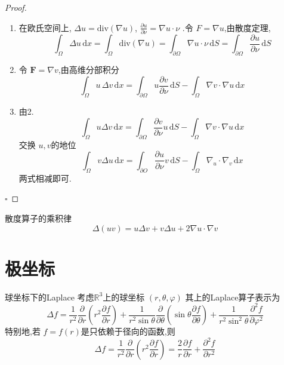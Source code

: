 \documentclass[../../main.tex]{subfiles}
\begin{document}
\begin{proof}
    \begin{enumerate}
        \item 在欧氏空间上, \(   \Delta u= \mathrm{div}\left(  \nabla u \right)   \), \(  \frac{\partial u}{\partial \nu }=  \nabla u\cdot  \nu   \)  .令 \(  F =   \nabla u  \),由散度定理, \[
        \int_{ \Omega } \Delta u\,\mathrm{d} x=  \int_{ \Omega } \mathrm{div}\left(  \nabla u \right)=  \int_{ \partial  \Omega } \nabla u\cdot  \nu \,\mathrm{d} S=  \int_{ \partial  \Omega } \frac{\partial u}{\partial \nu }\,\mathrm{d} S 
        \] 
        \item  令 \(  \mathbf{F}=  \nabla v  \),由高维分部积分 \[
        \int_{ \Omega } u  \,\Delta v\,\mathrm{d} x=  \int_{ \partial  \Omega } u\frac{\partial v}{\partial \nu }\,\mathrm{d} S- \int_{ \Omega }  \nabla v\cdot  \nabla u\,\mathrm{d} x
        \] 
        \item 由2. \[
        \int_{ \Omega }u \Delta v\,\mathrm{d} x=  \int_{ \partial  \Omega } \frac{\partial v}{\partial \nu }u \,\mathrm{d} S- \int_{ \Omega }  \nabla {v}\cdot  \nabla {u}\,\mathrm{d} x
        \]交换 \(  u,v  \)的地位  \[
        \int_{ \Omega }v \Delta u\,\mathrm{d} x= \int_{ \partial O}\frac{\partial u}{\partial \nu }v\,\mathrm{d} S-\int_{ \Omega }  \nabla _{u}\cdot  \nabla _{v}\,\mathrm{d} x
        \]两式相减即可.
    \end{enumerate}
    

    \hfill $\square$
\end{proof}

\begin{theorem}{散度算子的乘积律}
    \[
     \Delta \left( uv \right)= u \Delta v+ v \Delta u+ 2 \nabla u\cdot  \nabla v 
    \]
\end{theorem}

\section{极坐标}

\begin{theorem}{球坐标下的Laplace}
    考虑\(  \mathbb{R} ^{3}  \)上的球坐标 \(  \left( r, \theta , \varphi  \right)   \)  其上的Laplace算子表示为 \[
     \Delta f= \frac{1 }{r^{2} }\frac{\partial }{\partial r}\left( r^{2}\frac{\partial f}{\partial r} \right)+ \frac{1 }{r^{2}\sin  \theta  }\frac{\partial }{\partial  \theta }\left( \sin  \theta \frac{\partial f}{\partial  \theta } \right)+ \frac{1 }{r^{2}\sin ^{2} \theta  }\frac{\partial ^{2}f}{\partial  \varphi ^{2}}     
    \]特别地,若 \(  f= f\left( r \right)   \)是只依赖于径向的函数,则 \[
     \Delta f= \frac{1 }{r^{2} }\frac{\partial }{\partial r} \left( r^{2}\frac{\partial f}{\partial r} \right)= \frac{2 }{r }\frac{\partial f}{\partial r}  + \frac{\partial ^{2}f}{\partial r^{2}}
    \] 
\end{theorem}
\end{document}
